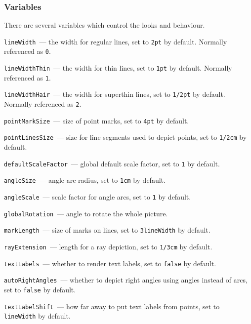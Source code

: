 \subsubsection{Variables}\label{Variables}
	
	There are several variables which control the looks and behaviour.
	
	\texttt{lineWidth}\label{lineWidth}~— the width for regular lines, set to \texttt{2pt} by default. Normally referenced as \texttt{0}.
	
	\texttt{lineWidthThin}~— the width for thin lines, set to \texttt{1pt} by default. Normally referenced as \texttt{1}.
	
	\texttt{lineWidthHair}~— the width for superthin lines, set to \texttt{1/2pt} by default. Normally referenced as \texttt{2}.
	
	\texttt{pointMarkSize}\label{pointMarkSize}~— size of point marks, set to \texttt{4pt} by default.
	
	\texttt{pointLinesSize}\label{pointLinesSize}~— size for line segments used to depict points, set to \texttt{1/2cm} by default.

	\texttt{defaultScaleFactor}~— global default scale factor, set to \texttt{1} by default.

	\texttt{angleSize}\label{angleSize}~— angle arc radius, set to \texttt{1cm} by default.
	
	\texttt{angleScale}\label{angleScale}~— scale factor for angle arcs, set to \texttt{1} by default.

	\texttt{globalRotation}~— angle to rotate the whole picture.

	\texttt{markLength}~— size of marks on lines, set to \texttt{3lineWidth} by default.

	\texttt{rayExtension}~— length for a ray depiction, set to \texttt{1/3cm} by default.

	
	\texttt{textLabels}~— whether to render text labels, set to \texttt{false} by default.


	\texttt{autoRightAngles}\label{autoRightAngles}~— whether to depict right angles using angles instead of arcs, set to \texttt{false} by default.

	
	\texttt{textLabelShift}~— how far away to put text labels from points, set to \texttt{lineWidth} by default.
	
